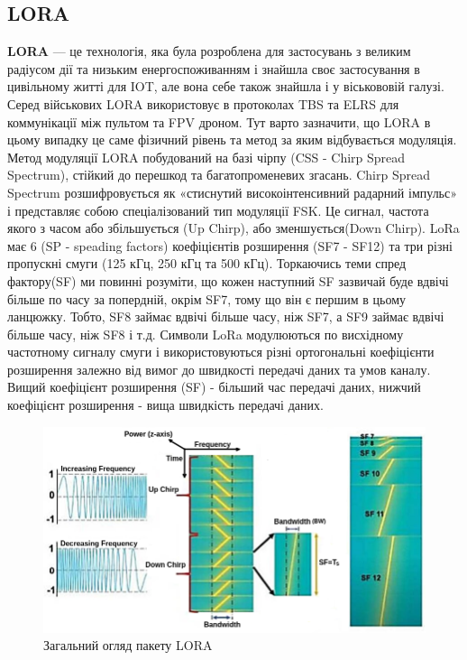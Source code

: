 \documentclass{article}
\begin{document}
\subsection{LORA}
\textbf{LORA} --- це технологія, яка була розроблена для застосувань з великим радіусом дії та низьким енергоспоживанням і знайшла своє застосування в цивільному житті для IOT, але вона себе також знайшла і у віськововій галузі. Серед військових LORA використовує в протоколах TBS та ELRS для коммунікації між пультом та FPV дроном. Тут варто зазначити, що LORA в цьому випадку це саме фізичний рівень та метод за яким відбувається модуляція. Метод модуляції LORA побудований на базі чірпу (CSS -  Chirp Spread Spectrum), стійкий до перешкод та багатопроменевих згасань. Chirp Spread Spectrum розшифровується як «стиснутий високоінтенсивний радарний імпульс» і представляє собою спеціалізований тип модуляції FSK. Це сигнал, частота якого з часом або збільшується (Up Chirp), або зменшується(Down Chirp). LoRa має 6 (SP - speading factors) коефіцієнтів розширення (SF7 - SF12) та три різні пропускні смуги (125 кГц, 250 кГц та 500 кГц). Торкаючись теми спред фактору(SF) ми повинні розуміти, що кожен наступний SF зазвичай буде вдвічі більше по часу за попердній, окрім SF7, тому що він є першим в цьому ланцюжку. Тобто, SF8 займає вдвічі більше часу, ніж SF7, а SF9 займає вдвічі більше часу, ніж SF8 і т.д. Символи LoRa модулюються по висхідному частотному сигналу смуги  і використовуються різні ортогональні коефіцієнти розширення залежно від вимог до швидкості передачі даних та умов каналу. Вищий коефіцієнт розширення (SF) - більший час передачі даних, нижчий коефіцієнт розширення - вища швидкість передачі даних.

\begin{figure}[h!]
	\centering
	\includegraphics[width=0.9\linewidth]{images/lora_chirp_main.png}
	\caption{\label{fig:lora_chirp_main} Загальний огляд пакету LORA}
\end{figure}
\end{document}
